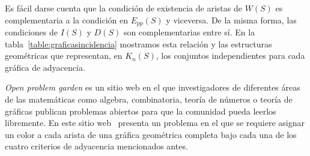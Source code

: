 Es fácil darse cuenta que la condición de existencia de aristas de $W(S)$ es
complementaria a la condición en $E_{pp}(S)$ y viceversa. De la misma
forma, las condiciones de $I(S)$ y $D(S)$ son complementarias entre sí. En la tabla~\ref{table:graficasincidencia}
mostramos esta relación y las estructuras geométricas
que representan, en $K_n(S)$, los conjuntos independientes para cada gráfica de adyacencia.

\emph{Open problem garden} es un sitio web en el que investigadores de diferentes áreas
de las matemáticas como algebra, combinatoria, teoría de números o teoría de gráficas
publican problemas abiertos para que la comunidad pueda leerlos libremente.
En este sitio web~\cite{OpenGarden2009} presenta un problema en el que se requiere asignar un
color a cada arista de una gráfica geométrica completa bajo cada una de los cuatro
criterios de adyacencia mencionados antes.

